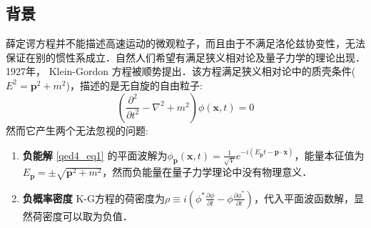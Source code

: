 
\subsection{背景}
薛定谔方程并不能描述高速运动的微观粒子，而且由于不满足洛伦兹协变性，无法保证在别的惯性系成立．自然人们希望有满足狭义相对论及量子力学的理论出现．1927年， Klein-Gordon 方程被顺势提出．该方程满足狭义相对论中的质壳条件($E^{2}=\boldsymbol{p}^{2}+m^{2}$)，描述的是无自旋的自由粒子:
\begin{equation}\label{qed4_eq1}
\left(\frac{\partial^{2}}{\partial t^{2}}-\nabla^{2}+m^{2}\right) \phi(\boldsymbol{x}, t)=0
\end{equation}
然而它产生两个无法忽视的问题:

\begin{enumerate}
\item \textbf{负能解}
\autoref{qed4_eq1} 的平面波解为$\phi_{\boldsymbol{p}}(\boldsymbol{x}, t)=\frac{1}{\sqrt{V}} e^{-i\left(E_{\boldsymbol{p}} t-\boldsymbol{p} \cdot \boldsymbol{x}\right)}$，能量本征值为
$E_{\boldsymbol{p}}=\pm \sqrt{\boldsymbol{p}^{2}+m^{2}}$，然而负能量在量子力学理论中没有物理意义．
\item \textbf{负概率密度}
K-G方程的荷密度为$\rho \equiv i\left(\phi^{*} \frac{\partial \phi}{\partial t}-\phi \frac{\partial \phi^{*}}{\partial t}\right)$，代入平面波函数解，显然荷密度可以取为负值．
\end{enumerate}
